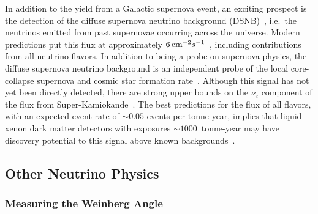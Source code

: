 In addition to the yield from a Galactic supernova event, an exciting prospect is the detection of the diffuse supernova neutrino background (DSNB)~\cite{Lunardini:2010ab,Beacom:2010kk}, i.e.~the neutrinos emitted from past supernovae occurring across the universe. Modern predictions put this flux at approximately $6\, \mathrm{cm^{-2}}s^{-1}$~\cite{Horiuchi:2008jz}, including contributions from all neutrino flavors. In addition to being a probe on supernova physics, the diffuse supernova neutrino background is an independent probe of the local core-collapse supernova and cosmic star formation rate~\cite{Hopkins:2006bw}. Although this signal has not yet been directly detected, there are strong upper bounds on the $\bar{\nu}_e$ component of the flux from Super-Kamiokande~\cite{Bays:2011si}. The best predictions for the flux of all flavors, with an expected event rate of $\sim 0.05$ events per tonne-year, implies that liquid xenon dark matter detectors with exposures $\sim 1000$~tonne-year may have discovery potential to this signal above known backgrounds~\cite{Strigari:2009bq}. 

\subsection{Other Neutrino Physics}

\subsubsection{Measuring the Weinberg Angle}


